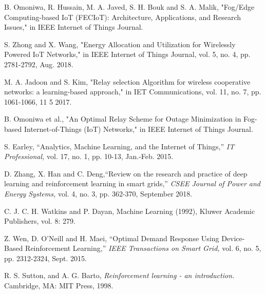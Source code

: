 \documentclass[journal]{IEEEtran}
\begin{document}
%
%
%
\begin{thebibliography}{1}

B. Omoniwa, R. Hussain, M. A. Javed, S. H. Bouk and S. A. Malik, "Fog/Edge Computing-based IoT (FECIoT): Architecture, Applications, and Research Issues," in IEEE Internet of Things Journal.

S. Zhong and X. Wang, "Energy Allocation and Utilization for Wirelessly Powered IoT Networks," in IEEE Internet of Things Journal, vol. 5, no. 4, pp. 2781-2792, Aug. 2018.

M. A. Jadoon and S. Kim, "Relay selection Algorithm for wireless cooperative networks: a learning-based approach," in IET Communications, vol. 11, no. 7, pp. 1061-1066, 11 5 2017.

B. Omoniwa et al., "An Optimal Relay Scheme for Outage Minimization in Fog-based Internet-of-Things (IoT) Networks," in IEEE Internet of Things Journal.

S. Earley, ``Analytics, Machine Learning, and the Internet of Things,'' \emph{IT Professional,} vol. 17, no. 1, pp. 10-13, Jan.-Feb. 2015.

D. Zhang, X. Han and C. Deng,``Review on the research and practice of deep learning and reinforcement learning in smart grids,'' \emph{CSEE Journal of Power and Energy Systems,} vol. 4, no. 3, pp. 362-370, September 2018.

C. J. C. H. Watkins and P. Dayan, Machine Learning (1992), Kluwer Academic Publishers, vol. 8: 279.

Z. Wen, D. O'Neill and H. Maei, ``Optimal Demand Response Using Device-Based Reinforcement Learning,'' \emph{IEEE Transactions on Smart Grid,} vol. 6, no. 5, pp. 2312-2324, Sept. 2015.

R. S. Sutton, and A. G. Barto, \emph{Reinforcement learning - an introduction.} Cambridge, MA: MIT Press, 1998.


\end{thebibliography}
\end{document}
